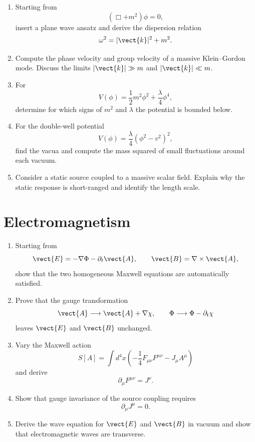 \begin{enumerate}
    \item Starting from
    \[
        (\Box+m^2)\phi=0,
    \]
    insert a plane wave ansatz and derive the dispersion relation
    \[
        \omega^2=|\vect{k}|^2+m^2.
    \]

    \item Compute the phase velocity and group velocity of a massive
    Klein--Gordon mode. Discuss the limits \(|\vect{k}|\gg m\) and
    \(|\vect{k}|\ll m\).

    \item For
    \[
        V(\phi)=\frac{1}{2}m^2\phi^2+\frac{\lambda}{4}\phi^4,
    \]
    determine for which signs of \(m^2\) and \(\lambda\) the potential is bounded
    below.

    \item For the double-well potential
    \[
        V(\phi)=\frac{\lambda}{4}(\phi^2-v^2)^2,
    \]
    find the vacua and compute the mass squared of small fluctuations around
    each vacuum.

    \item Consider a static source coupled to a massive scalar field. Explain why
    the static response is short-ranged and identify the length scale.
\end{enumerate}

\section{Electromagnetism}

\begin{enumerate}
    \item Starting from
    \[
        \vect{E}=-\nabla\Phi-\partial_t\vect{A},
        \qquad
        \vect{B}=\nabla\times\vect{A},
    \]
    show that the two homogeneous Maxwell equations are automatically satisfied.

    \item Prove that the gauge transformation
    \[
        \vect{A}\longrightarrow \vect{A}+\nabla\chi,
        \qquad
        \Phi\longrightarrow \Phi-\partial_t\chi
    \]
    leaves \(\vect{E}\) and \(\vect{B}\) unchanged.

    \item Vary the Maxwell action
    \[
        S[A]=\int d^4x\left(-\frac{1}{4}F_{\mu\nu}F^{\mu\nu}-J_\mu A^\mu\right)
    \]
    and derive
    \[
        \partial_\mu F^{\mu\nu}=J^\nu.
    \]

    \item Show that gauge invariance of the source coupling requires
    \[
        \partial_\mu J^\mu=0.
    \]

    \item Derive the wave equation for \(\vect{E}\) and \(\vect{B}\) in vacuum and
    show that electromagnetic waves are transverse.
\end{enumerate}

